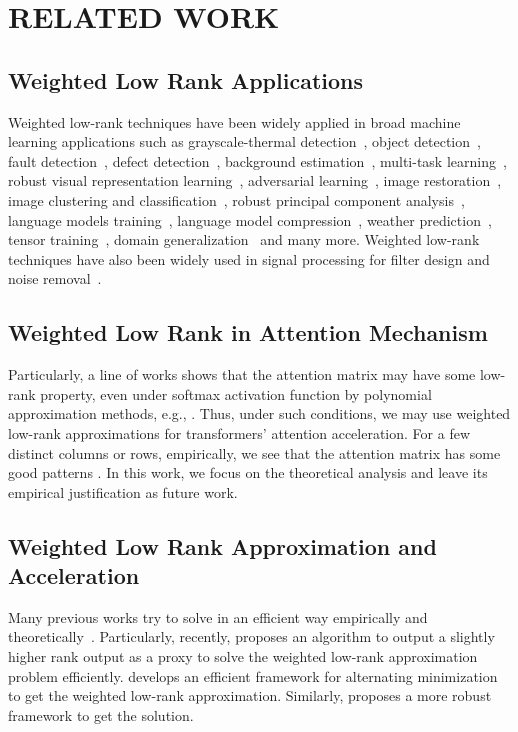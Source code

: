 \section{RELATED WORK}
\label{sec:related}

\subsection{Weighted Low Rank Applications}
Weighted low-rank techniques have been widely applied in broad machine learning applications such as grayscale-thermal detection~\cite{lwz+16}, object detection~\cite{twzl16,cxt22}, fault detection~\cite{dcz+17}, defect detection~\cite{mww+20,jld+20}, background estimation~\cite{dl17,dlr18}, multi-task learning~\cite{flct18}, robust visual representation learning~\cite{kjn15,wzx+18,wwz+19}, adversarial learning~\cite{lbb+19}, image restoration~\cite{psdx14,cyz+20}, image clustering and classification~\cite{sjs+11,wl17,wllz18,fzcw21,fzc+22,fzc+22b,kkk+23,pcp+23}, robust principal component analysis~\cite{xxf+21}, language models training~\cite{hhw+22}, language model compression~\cite{hhc+21}, weather prediction~\cite{wtl18}, tensor training~\cite{cwc+21,zwht+22}, domain generalization~\cite{smf+24} and many more.
Weighted low-rank techniques have also been widely used in signal processing for filter design and noise removal~\cite{lpw97,lhzc10,jycl15}. 

\subsection{Weighted Low Rank in Attention Mechanism} Particularly, a line of works shows that the attention matrix may have some low-rank property, even under softmax activation function by polynomial approximation methods, e.g., \cite{as23,kll+25_var,lls+25_prune,chl+24_rope,llss24_sparse,lls+24c,lss+24,lssy24,lssz24_tat,swxl24,xsl24,as24_iclr,as24_rope,as24b,hsk+24,hwg+24,hwl+24,hwsl24}. Thus, under such conditions, we may use weighted low-rank approximations for transformers' attention acceleration. For a few distinct columns or rows, empirically, we see that the attention matrix has some good patterns \cite{jlz+24,cls+25,lls+25_grok,cll+25_icl,smn+24}. In this work, we focus on the theoretical analysis and leave its empirical justification as future work.

\subsection{Weighted Low Rank Approximation and Acceleration}
Many previous works try to solve in an efficient way empirically and theoretically~\cite{mmh03,slv04,wj06,mv07,m08,ev12,mxzz13,mu14,rsw16,llr16,d16,dl17,dl17b,bwz19,hlx+19,zqz+19,swz+20,th21,yzls22,syyz23,zyls24}. Particularly, recently, \cite{wy24} proposes an algorithm to output a slightly higher rank output as a proxy to solve the weighted low-rank approximation problem efficiently.
\cite{llr16} develops an efficient framework for alternating minimization to get the weighted low-rank approximation. Similarly, \cite{syyz23} proposes a more robust framework to get the solution. 



